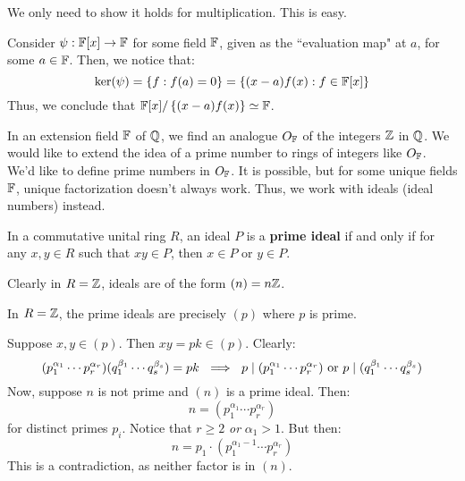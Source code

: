 \begin{pf}
    We only need to show it holds for multiplication. This is easy.
\end{pf}

\begin{xmp}[source=Primary Source Material]
    Consider $ \psi:\mathbb{F}[x] \rightarrow \mathbb{F} $ for some field $ \mathbb{F} $, given as the
    ``evaluation map" at $ a $, for some $ a \in \mathbb{F} $. \vsp
    Then, we notice that:
    \begin{equation*}
       \ker(\psi) = \left\{{f:f(a)=0}\right\} = \left\{{(x-a)f(x):f \in \mathbb{F}[x]}\right\} 
    \end{equation*}
    Thus, we conclude that $ \mathbb{F}[x]/\left\{{(x-a)f(x)}\right\} \simeq \mathbb{F} $.
\end{xmp}

In an extension field $ \mathbb{F} $ of $ \mathbb{Q} $, we find an analogue $ O_{\mathbb{F}} $ of the
integers $ \mathbb{Z} $ in $ \mathbb{Q} $.
We would like to extend the idea of a prime number to rings of integers like $ O_{\mathbb{F}} $.
We'd like to define prime numbers in $ O_{\mathbb{F}} $. It is possible, but for some unique fields
$ \mathbb{F} $, unique factorization doesn't always work. Thus, we work with ideals (ideal numbers)
instead.

\vspace{-0.1in}
\begin{defn}
    In a commutative unital ring $ R $, an ideal $ P $ is a \textbf{prime ideal} if and only if
    for any $ x,y \in R $ such that $ xy \in P $, then $ x \in P $ or $ y \in P $.
\end{defn}
\vspace{-0.1in}
Clearly in $ R = \mathbb{Z} $, ideals are of the form $ (n) = n\mathbb{Z} $.
\vspace{-0.1in}

\begin{thm}
    In $ R = \mathbb{Z} $, the prime ideals are precisely $ (p) $ where $ p $ is prime.
\end{thm} \vspace{-0.1in}

\begin{pf}[source=Primary Source Material]
    Suppose $ x,y \in (p) $. Then $ xy = pk \in (p) $. Clearly:
    \begin{equation*}
        (p_{1}^{\alpha_{1}}\cdots p_{r}^{\alpha_{r}})
        (q_{1}^{\beta_{1}}\cdots q_{s}^{\beta_{s}}) = pk \ \implies \
        p \mid (p_{1}^{\alpha_{1}}\cdots p_{r}^{\alpha_{r}}) \textrm{ or }
        p \mid (q_{1}^{\beta_{1}}\cdots q_{s}^{\beta_{s}})
    \end{equation*} \vsp
    Now, suppose $ n $ is not prime and $ (n) $ is a prime ideal. Then:
    \begin{equation*}
        n = (p_{1}^{\alpha_{1}}\cdots p_{r}^{\alpha_{r}})
    \end{equation*}
    for distinct primes $ p_{i} $. Notice that $ r \geq 2 $ \textit{or} $ \alpha_{1} > 1 $.
    But then:
    \begin{equation*}
        n = p_{1} \cdot (p_{1}^{\alpha_{1}-1}\cdots p_{r}^{\alpha_{r}})
    \end{equation*}
    This is a contradiction, as neither factor is in $ (n) $.
\end{pf}

